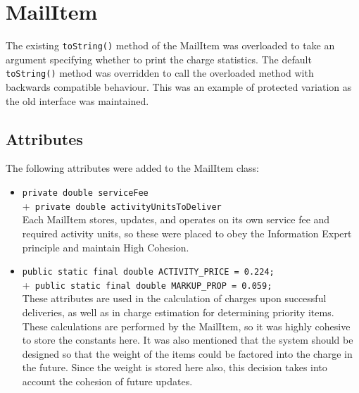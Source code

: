 \documentclass{article}
\begin{document}
\section{MailItem}
The existing \verb|toString()| method of the MailItem was overloaded to take an argument specifying whether to print the charge statistics. The default \verb|toString()| method was overridden to call the overloaded method with backwards compatible behaviour. This was an example of protected variation as the old interface was maintained.
\subsection{Attributes}
The following attributes were added to the MailItem class:
\begin{itemize}
    \item \verb|private double serviceFee|\\
         +\verb| private double activityUnitsToDeliver|\\[2mm]
    Each MailItem stores, updates, and operates on its own service fee and required activity units, so these were placed to obey the Information Expert principle and maintain High Cohesion.
    \item \verb|public static final double ACTIVITY_PRICE = 0.224;|\\
    +\verb| public static final double MARKUP_PROP = 0.059;|\\[2mm]
    These attributes are used in the calculation of charges upon successful deliveries, as well as in charge estimation for determining priority items. These calculations are performed by the MailItem, so it was highly cohesive to store the constants here. It was also mentioned that the system should be designed so that the weight of the items could be factored into the charge in the future. Since the weight is stored here also, this decision takes into account the cohesion of future updates.
\end{itemize}
\end{document}
